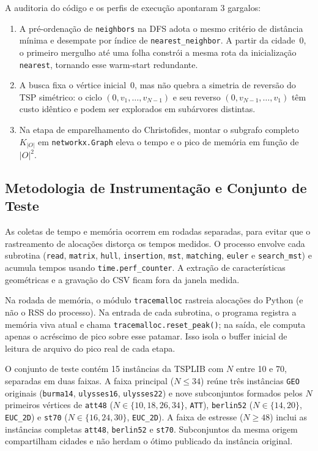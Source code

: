\documentclass[12pt]{article}
\begin{document}
A auditoria do código e os perfis de execução apontaram 3 gargalos:
\begin{enumerate}
  \item A pré-ordenação de \texttt{neighbors} na DFS adota o mesmo critério de distância mínima e desempate por índice de \texttt{nearest\_neighbor}. A partir da cidade~0, o primeiro mergulho até uma folha constrói a mesma rota da inicialização \texttt{nearest}, tornando esse warm-start redundante.
  \item A busca fixa o vértice inicial~0, mas não quebra a simetria de reversão do TSP simétrico: o ciclo $(0, v_1, \dots, v_{N-1})$ e seu reverso $(0, v_{N-1}, \dots, v_1)$ têm custo idêntico e podem ser explorados em subárvores distintas.
  \item Na etapa de emparelhamento do Christofides, montar o subgrafo completo $K_{|O|}$ em \texttt{networkx.Graph} eleva o tempo e o pico de memória em função de $|O|^2$.
\end{enumerate}

\subsection{Metodologia de Instrumentação e Conjunto de Teste}

As coletas de tempo e memória ocorrem em rodadas separadas, para evitar que o rastreamento de alocações distorça os tempos medidos. O processo envolve cada subrotina (\texttt{read}, \texttt{matrix}, \texttt{hull}, \texttt{insertion}, \texttt{mst}, \texttt{matching}, \texttt{euler} e \texttt{search\_mst}) e acumula tempos usando \texttt{time.perf\_counter}. A extração de características geométricas e a gravação do CSV ficam fora da janela medida.

Na rodada de memória, o módulo \texttt{tracemalloc} rastreia alocações do Python (e não o RSS do processo). Na entrada de cada subrotina, o programa registra a memória viva atual e chama \texttt{tracemalloc.reset\_peak()}; na saída, ele computa apenas o acréscimo de pico sobre esse patamar. Isso isola o buffer inicial de leitura de arquivo do pico real de cada etapa.

O conjunto de teste contém 15 instâncias da TSPLIB com $N$ entre 10 e 70, separadas em duas faixas. A faixa principal ($N \le 34$) reúne três instâncias \texttt{GEO} originais (\texttt{burma14}, \texttt{ulysses16}, \texttt{ulysses22}) e nove subconjuntos formados pelos $N$ primeiros vértices de \texttt{att48} ($N \in \{10, 18, 26, 34\}$, \texttt{ATT}), \texttt{berlin52} ($N \in \{14, 20\}$, \texttt{EUC\_2D}) e \texttt{st70} ($N \in \{16, 24, 30\}$, \texttt{EUC\_2D}). A faixa de estresse ($N \ge 48$) inclui as instâncias completas \texttt{att48}, \texttt{berlin52} e \texttt{st70}. Subconjuntos da mesma origem compartilham cidades e não herdam o ótimo publicado da instância original.
\end{document}
